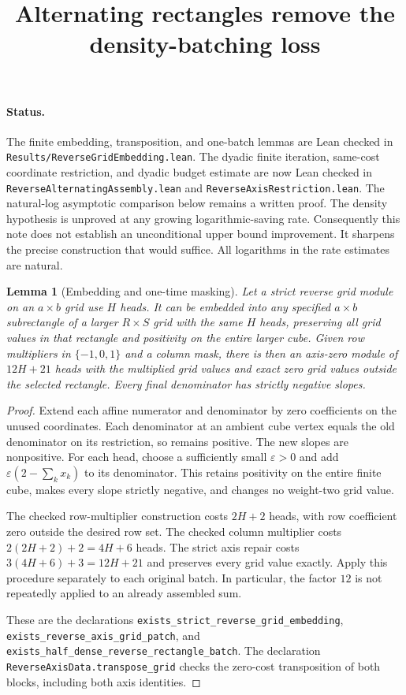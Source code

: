 \documentclass[11pt]{article}
\newtheorem{lemma}[theorem]{Lemma}
\begin{document}
\title{Alternating rectangles remove the density-batching loss}
\author{}\date{}\maketitle

\paragraph{Status.}
The finite embedding, transposition, and one-batch lemmas are Lean checked
in \texttt{Results/ReverseGridEmbedding.lean}. The dyadic finite iteration,
same-cost coordinate restriction, and dyadic budget estimate are now Lean
checked in \texttt{ReverseAlternatingAssembly.lean} and
\texttt{ReverseAxisRestriction.lean}. The natural-log asymptotic
comparison below remains a written proof.
The density hypothesis is unproved at any growing logarithmic-saving
rate. Consequently this note does not establish an unconditional upper
bound improvement. It sharpens the precise construction that would suffice.
All logarithms in the rate estimates are natural.

\begin{lemma}[Embedding and one-time masking]
Let a strict reverse grid module on an $a\times b$ grid use $H$ heads.
It can be embedded into any specified $a\times b$ subrectangle of a
larger $R\times S$ grid with the same $H$ heads, preserving all grid
values in that rectangle and positivity on the entire larger cube.
Given row multipliers in $\{-1,0,1\}$ and a column mask, there is then
an axis-zero module of $12H+21$ heads with the multiplied grid values
and exact zero grid values outside the selected rectangle.
Every final denominator has strictly negative slopes.
\end{lemma}
\begin{proof}
Extend each affine numerator and denominator by zero coefficients on
the unused coordinates. Each denominator at an ambient cube vertex
equals the old denominator on its restriction, so remains positive.
The new slopes are nonpositive. For each head, choose a sufficiently
small $\varepsilon>0$ and add
$\varepsilon(2-\sum_k x_k)$ to its denominator. This retains positivity
on the entire finite cube, makes every slope strictly negative, and
changes no weight-two grid value.

The checked row-multiplier construction costs $2H+2$ heads, with
row coefficient zero outside the desired row set. The checked column
multiplier costs $2(2H+2)+2=4H+6$ heads. The strict axis repair costs
$3(4H+6)+3=12H+21$ and preserves every grid value exactly.
Apply this procedure separately to each original batch. In particular,
the factor $12$ is not repeatedly applied to an already assembled sum.

These are the declarations
\texttt{exists\_strict\_reverse\_grid\_embedding},
\texttt{exists\_reverse\_axis\_grid\_patch}, and
\texttt{exists\_half\_dense\_reverse\_rectangle\_batch}.
The declaration \texttt{ReverseAxisData.transpose\_grid} checks the
zero-cost transposition of both blocks, including both axis identities.
\end{proof}
\end{document}
